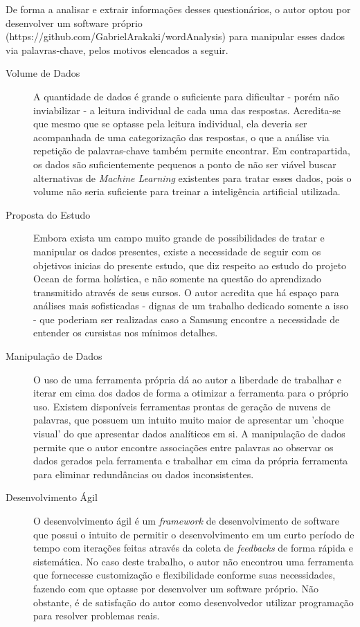 De forma a analisar e extrair informações desses questionários, o autor optou por desenvolver um software próprio (https://github.com/GabrielArakaki/wordAnalysis) para manipular esses dados via palavras-chave, pelos motivos elencados a seguir.

\begin{description}
\item [Volume de Dados] A quantidade de dados é grande o suficiente para dificultar - porém não inviabilizar - a leitura individual de cada uma das respostas. Acredita-se que mesmo que se optasse pela leitura individual, ela deveria ser acompanhada de uma categorização das respostas, o que a análise via repetição de palavras-chave também permite encontrar. Em contrapartida, os dados são suficientemente pequenos a ponto de não ser viável buscar alternativas  de \textit{Machine Learning} existentes para tratar esses dados, pois o volume não seria suficiente para treinar a inteligência artificial utilizada.

\item [Proposta do Estudo] Embora exista um campo muito grande de possibilidades de tratar e manipular os dados presentes, existe a necessidade de seguir com os objetivos inicias do presente estudo, que diz respeito ao estudo do projeto Ocean de forma holística, e não somente na questão do aprendizado transmitido através de seus cursos. O autor acredita que há espaço para análises mais sofisticadas - dignas de um trabalho dedicado somente a isso - que poderiam ser realizadas caso a Samsung encontre a necessidade de entender os cursistas nos mínimos detalhes.

\item [Manipulação de Dados] O uso de uma ferramenta própria dá ao autor a liberdade de trabalhar e iterar em cima dos dados de forma a otimizar a ferramenta para o próprio uso. Existem disponíveis ferramentas prontas de geração de nuvens de palavras, que possuem um intuito muito maior de apresentar um 'choque visual' do que apresentar dados analíticos em si. A manipulação de dados permite que o autor encontre associações entre palavras ao observar os dados gerados pela ferramenta e trabalhar em cima da própria ferramenta para eliminar redundâncias ou dados inconsistentes.

\item [Desenvolvimento Ágil] O desenvolvimento ágil é um \textit{framework} de desenvolvimento de software que possui o intuito de permitir o desenvolvimento em um curto período de tempo com iterações feitas através da coleta de \textit{feedbacks} de forma rápida e sistemática. No caso deste trabalho, o autor não encontrou uma ferramenta que fornecesse customização e flexibilidade conforme suas necessidades, fazendo com que optasse por desenvolver um software próprio. Não obstante, é de satisfação do autor como desenvolvedor utilizar programação para resolver problemas reais.
 
\end{description}


